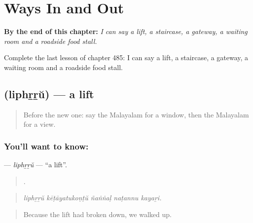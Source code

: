 
\chapter{Ways In and Out}
\label{ch:ml-ways-in-and-out}

\begin{chapteropening}
\textbf{By the end of this chapter:} \emph{I can say a lift, a staircase, a gateway, a waiting room and a roadside food stall.}

Complete the last lesson of chapter 485: I can say a lift, a staircase, a gateway, a waiting room and a roadside food stall.
\end{chapteropening}

\section[\texorpdfstring{\ml{ലിഫ്റ്റ്} (liphṟṟŭ)}{ലിഫ്റ്റ് (liphṟṟŭ)}]{ (liphṟṟŭ) — a lift}

\label{lesson:ML-C485-liphrru}



\begin{quote}
Before the new one: say the Malayalam for a window, then the Malayalam for a view.
\end{quote}

\subsection*{You'll want to know: }
\textbf{} — \emph{liphṟṟŭ} — \textquotedblleft{}a lift\textquotedblright{}.

\begin{quote}
    .
\end{quote}

\begin{quote}
\emph{liphṟṟŭ kēṭāyatukoṇṭŭ ñaṅṅaḷ naṭannu kayaṟi.}
\end{quote}

\begin{quote}
Because the lift had broken down, we walked up.
\end{quote}


